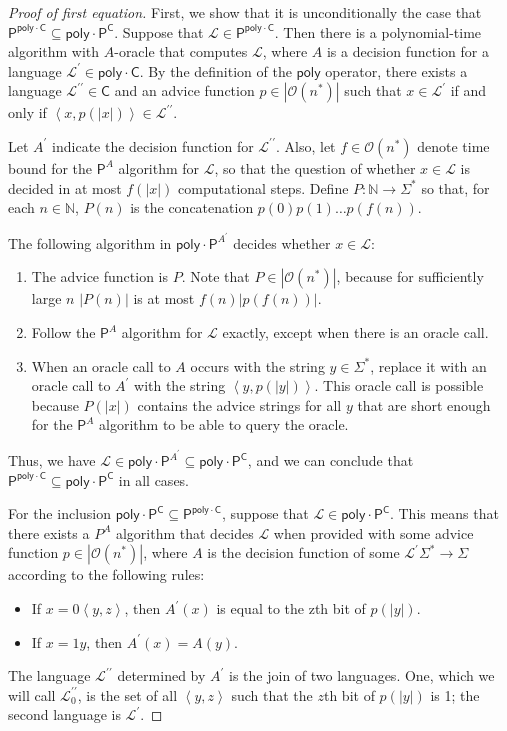 \documentclass[12pt]{amsart}
\theoremstyle{definition}
\theoremstyle{remark}
\newcommand{\N}{\mathbb{N}}
\newcommand{\cL}{\mathcal{L}}
\newcommand{\sC}{\mathsf{C}}
\newcommand{\sP}{\mathsf{P}}
\newcommand{\poly}{\mathsf{poly}}
\newcommand{\Oh}{\mathcal{O}}
\newcommand{\inner}[1]{\left\langle#1\right\rangle}
\begin{document}
\begin{proof}[Proof of first equation]
First, we show that it is unconditionally the case that
$\sP^{\poly\cdot\sC}\subseteq\poly\cdot\sP^\sC$. Suppose that
$\cL\in\sP^{\poly\cdot\sC}$. Then there is a polynomial-time algorithm with
$A$-oracle that computes $\cL$, where $A$ is a decision function for a language
$\cL^\prime\in\poly\cdot\sC$. By the definition of the $\poly$ operator, there
exists a language $\cL^{\prime\prime}\in\sC$ and an advice function
$p\in|\Oh(n^*)|$ such that $x\in\cL^\prime$ if and only if
$\inner{x,p(|x|)}\in\cL^{\prime\prime}$.

Let $A^\prime$ indicate the decision function for $\cL^{\prime\prime}$. Also,
let $f\in\Oh(n^*)$ denote time bound for the $\sP^A$ algorithm for $\cL$, so
that the question of whether $x\in\cL$ is decided in at most $f(|x|)$
computational steps. Define $P:\N\rightarrow\Sigma^*$ so that, for each
$n\in\N$, $P(n)$ is the concatenation $p(0)p(1)\ldots p(f(n))$.

The following algorithm in $\poly\cdot\sP^{A^\prime}$ decides whether $x\in\cL$:
\begin{enumerate}
\item The advice function is $P$. Note that $P\in|\Oh(n^*)|$, because for
  sufficiently large $n$ $|P(n)|$ is at most $f(n)|p(f(n))|$.
\item Follow the $\sP^A$ algorithm for $\cL$ exactly, except when there is an
  oracle call.
\item When an oracle call to $A$ occurs with the string $y\in\Sigma^*$, replace
  it with an oracle call to $A^\prime$ with the string $\inner{y,p(|y|)}$. This
  oracle call is possible because $P(|x|)$ contains the advice strings for all
  $y$ that are short enough for the $\sP^A$ algorithm to be able to query the
  oracle.
\end{enumerate}
Thus, we have $\cL\in\poly\cdot\sP^{A^\prime}\subseteq\poly\cdot\sP^\sC$, and we
can conclude that $\sP^{\poly\cdot\sC}\subseteq\poly\cdot\sP^\sC$ in all cases.

For the inclusion $\poly\cdot\sP^\sC\subseteq\sP^{\poly\cdot\sC}$, suppose that
$\cL\in\poly\cdot\sP^\sC$. This means that there exists a $P^A$ algorithm that
decides $\cL$ when provided with some advice function $p\in|\Oh(n^*)|$, where
$A$ is the decision function of some $\cL^\prime\Sigma^*\rightarrow\Sigma$
according to the following rules:
\begin{itemize}
\item If $x=0\inner{y,z}$, then $A^\prime(x)$ is equal to the zth bit of
  $p(|y|)$.
\item If $x=1y$, then $A^\prime(x)=A(y)$.
\end{itemize}
The language $\cL^{\prime\prime}$ determined by $A^\prime$ is the join of two
languages. One, which we will call $\cL_0^{\prime\prime}$, is the set of all
$\inner{y,z}$ such that the $z$th bit of $p(|y|)$ is 1; the second language is
$\cL^\prime$.


\end{proof}
\end{document}
